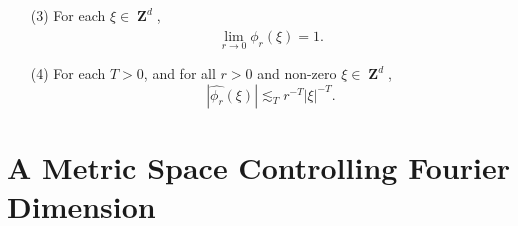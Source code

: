 \documentclass[12pt,reqno]{article}
\numberwithin{equation}{section}
\DeclareMathOperator{\ZZ}{\mathbf{Z}}
\DeclareMathOperator{\TT}{\mathbf{T}}
\begin{document}
\begin{itemize}
\begin{enumerate}

    \item[(3)] For each $\xi \in \ZZ^d$,
    \begin{equation} \label{approximationtoidentitypointwiseconvergence}
        \lim_{r \to 0} \widehat{\phi_r}(\xi) = 1.
    \end{equation}
        
    \item[(4)] For each $T > 0$, and for all $r > 0$ and non-zero $\xi \in \ZZ^d$,
    \begin{equation} \label{molificationdecaybound}
        |\widehat{\phi_r}(\xi)| \lesssim_T r^{-T} |\xi|^{-T}.
    \end{equation}
\end{enumerate}
\end{itemize}

\section{A Metric Space Controlling Fourier Dimension}
\end{document}
